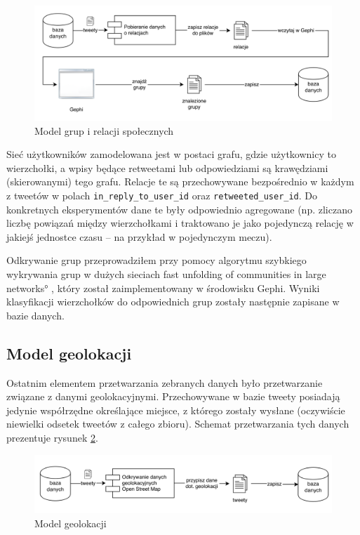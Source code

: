 \begin{figure}[ht!]
\centering
\includegraphics[width=160mm]{img/odkrywanie-relacji.png}
\caption{Model grup i relacji społecznych}
\label{image:odkrywanie-relacji}
\end{figure}


Sieć użytkowników zamodelowana jest w postaci grafu, gdzie użytkownicy to
wierzchołki, a wpisy będące retweetami lub odpowiedziami są krawędziami
(skierowanymi) tego grafu. Relacje te są przechowywane bezpośrednio w każdym z
tweetów w polach \texttt{in\_reply\_to\_user\_id} oraz
\texttt{retweeted\_user\_id}.
Do konkretnych eksperymentów dane te były odpowiednio agregowane (np. zliczano
liczbę powiązań między wierzchołkami i traktowano je jako pojedynczą relację w
jakiejś jednostce czasu -- na przykład w pojedynczym meczu).

Odkrywanie grup przeprowadziłem przy pomocy algorytmu szybkiego wykrywania grup
w dużych sieciach \ang{fast unfolding of communities in large networks}
, który został zaimplementowany w
środowisku Gephi. Wyniki klasyfikacji wierzchołków do odpowiednich grup zostały
następnie zapisane w bazie danych.


\subsection{Model geolokacji}
\label{subsection:modelgeolokacji}
Ostatnim elementem przetwarzania zebranych danych było przetwarzanie związane z
danymi geolokacyjnymi. Przechowywane w bazie tweety posiadają jedynie współrzędne
określające miejsce, z którego zostały wysłane (oczywiście niewielki odsetek
tweetów z całego zbioru). Schemat przetwarzania tych danych prezentuje rysunek
\ref{image:odkrywanie-geolokacji}.

\begin{figure}[ht!]
\centering
\includegraphics[width=160mm]{img/odkrywanie-geolokacji.png}
\caption{Model geolokacji}
\label{image:odkrywanie-geolokacji}
\end{figure}

